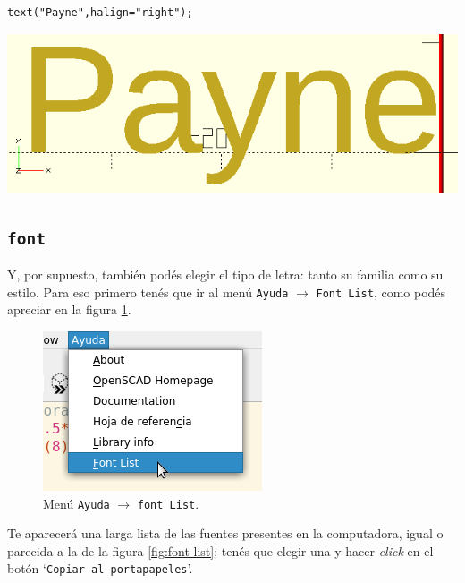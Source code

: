 \begin{center}
\begin{minipage}[]{.65\textwidth}%
 \begin{lstlisting}[numbers=none]
text("Payne",halign="right");
\end{lstlisting}%
\end{minipage}\hfill
\begin{minipage}[]{.35\textwidth}%
  \centering
  \includegraphics[width=.7\textwidth]{imagenes/payne-right}
\end{minipage}
\end{center}



\subsection{\texttt{font}}

\guillemotright Y, por supuesto, también podés elegir el tipo de
letra: tanto su familia como su estilo. Para eso primero tenés que ir
al menú \texttt{Ayuda} $\longrightarrow$ \texttt{Font List}, como podés
apreciar en la figura \ref{fig:menu-font-list}.


\begin{figure}[ht]
  \centering
  \includegraphics[width=.45\textwidth]{imagenes/menu-font-list}  
  \caption{Menú \texttt{Ayuda} $\rightarrow$ \texttt{font List}.}
  \label{fig:menu-font-list}
\end{figure}


\guillemotright Te aparecerá una larga lista de las fuentes presentes
en la computadora, igual o parecida a la de la figura
\ref{fig:font-list}; tenés que elegir una y hacer \emph{click} en el
botón `\texttt{Copiar al portapapeles}'.

